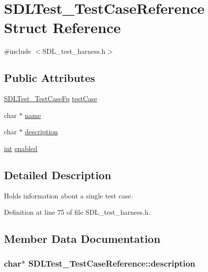 \hypertarget{struct_s_d_l_test___test_case_reference}{\section{S\-D\-L\-Test\-\_\-\-Test\-Case\-Reference Struct Reference}
\label{struct_s_d_l_test___test_case_reference}
}


{\ttfamily \#include $<$S\-D\-L\-\_\-test\-\_\-harness.\-h$>$}

\subsection*{Public Attributes}
\begin{DoxyCompactItemize}
\item 
\hyperlink{_s_d_l__test__harness_8h_a999ef3d353a817ab1c127f3c607d8c7d}{S\-D\-L\-Test\-\_\-\-Test\-Case\-Fp} \hyperlink{struct_s_d_l_test___test_case_reference_af9472f0c421a2845b540fc28fb30a3ef}{test\-Case}
\item 
char $\ast$ \hyperlink{struct_s_d_l_test___test_case_reference_aabd588c915c52fb13bcd0c71e071a604}{name}
\item 
char $\ast$ \hyperlink{struct_s_d_l_test___test_case_reference_a1ee6c8a2529fdfcd62bb1483c26be67d}{description}
\item 
\hyperlink{_s_d_l__thread_8h_a6a64f9be4433e4de6e2f2f548cf3c08e}{int} \hyperlink{struct_s_d_l_test___test_case_reference_a15168c85e38cae7557b4beb477ef6f9a}{enabled}
\end{DoxyCompactItemize}


\subsection{Detailed Description}
Holds information about a single test case. 

Definition at line 75 of file S\-D\-L\-\_\-test\-\_\-harness.\-h.



\subsection{Member Data Documentation}
\hypertarget{struct_s_d_l_test___test_case_reference_a1ee6c8a2529fdfcd62bb1483c26be67d}{
\subsubsection[{description}]{\setlength{\rightskip}{0pt plus 5cm}char$\ast$ S\-D\-L\-Test\-\_\-\-Test\-Case\-Reference\-::description}}\label{struct_s_d_l_test___test_case_reference_a1ee6c8a2529fdfcd62bb1483c26be67d}


